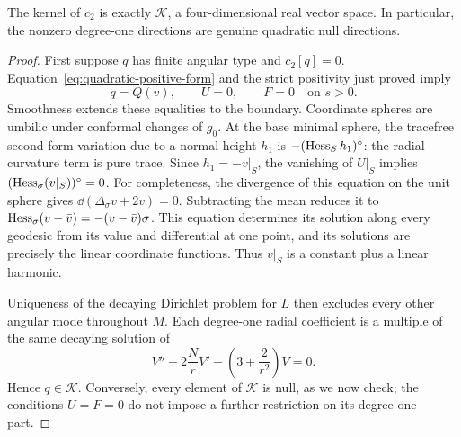 \begin{corollary}
\label{cor:kernel}
The kernel of $c_2$ is exactly $\mathcal K$, a four-dimensional real
vector space.  In particular, the nonzero degree-one directions are
genuine quadratic null directions.
\end{corollary}

\begin{proof}
First suppose $q$ has finite angular type and $c_2[q]=0$.
Equation~\eqref{eq:quadratic-positive-form} and the strict positivity
just proved imply
\begin{equation}
 q=Q(v),\qquad U=0,\qquad F=0
 \quad\text{on }s>0.
 \label{eq:quadratic-equality-conditions}
\end{equation}
Smoothness extends these equalities to the boundary.  Coordinate
spheres are umbilic under conformal changes of $g_0$.  At the base
minimal sphere, the tracefree second-form variation due to a normal
height $h_1$ is $-(\operatorname{Hess}_Sh_1)^{\circ}$: the radial curvature term is
pure trace.  Since $h_1=-v|_S$, the vanishing of $U|_S$ implies
$(\operatorname{Hess}_\sigma(v|_S))^{\circ}=0$.
For completeness, the divergence of this equation on the unit sphere
gives $\dd(\Delta_\sigma v+2v)=0$.  Subtracting the mean reduces it to
$\operatorname{Hess}_\sigma(v-\bar v)=-(v-\bar v)\sigma$.
This equation determines its solution along every geodesic from its
value and differential at one point, and its solutions are precisely
the linear coordinate functions.  Thus $v|_S$ is a constant plus a
linear harmonic.

Uniqueness of the decaying Dirichlet problem for $L$ then excludes
every other angular mode throughout $M$.  Each degree-one radial
coefficient is a multiple of the same decaying solution of
\begin{equation}
 V''+2\frac NrV'-\left(3+\frac2{r^2}\right)V=0.
 \label{eq:dipole-radial-ode}
\end{equation}
Hence $q\in\mathcal K$.  Conversely, every element of $\mathcal K$
is null, as we now check; the conditions $U=F=0$ do not impose a further
restriction on its degree-one part.


\end{proof}

